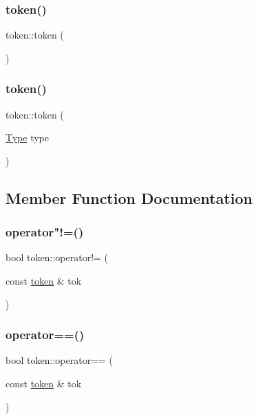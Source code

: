 \subsubsection{\texorpdfstring{token()}{token()}\hspace{0.1cm}{\footnotesize\ttfamily [1/2]}}
{\footnotesize\ttfamily token\+::token (\begin{DoxyParamCaption}{ }\end{DoxyParamCaption})}

\mbox{\label{structtoken_a40048af660a108bc9c12ead64c0db095}} 
\subsubsection{\texorpdfstring{token()}{token()}\hspace{0.1cm}{\footnotesize\ttfamily [2/2]}}
{\footnotesize\ttfamily token\+::token (\begin{DoxyParamCaption}\item[{\mbox{\hyperlink{_token_8h_a1d1cfd8ffb84e947f82999c682b666a7}{Type}}}]{type }\end{DoxyParamCaption})}



\subsection{Member Function Documentation}
\mbox{\label{structtoken_a9aebe580288a11656d556f46810b3ca3}} 
\subsubsection{\texorpdfstring{operator"!=()}{operator!=()}}
{\footnotesize\ttfamily bool token\+::operator!= (\begin{DoxyParamCaption}\item[{const \mbox{\hyperlink{structtoken}{token}} \&}]{tok }\end{DoxyParamCaption})}

\mbox{\label{structtoken_a04fcf43dceb55d44e5d940c32e484459}} 
\subsubsection{\texorpdfstring{operator==()}{operator==()}}
{\footnotesize\ttfamily bool token\+::operator== (\begin{DoxyParamCaption}\item[{const \mbox{\hyperlink{structtoken}{token}} \&}]{tok }\end{DoxyParamCaption})}



